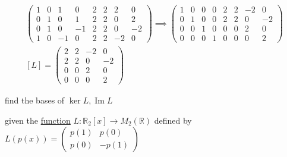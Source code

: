 \documentclass[a4paper,12pt]{article}
\DeclareMathOperator{\img}{Im}
\begin{document}
\begin{definition}
\begin{question}
\begin{subquestion}
\begin{answer}
\begin{gather*}
  \left(
    \begin{array}{cccc|cccc}
      1 & 0 & 1 & 0 & 2 & 2 & 2 & 0\\
      0 & 1 & 0 & 1 & 2 & 2 & 0 & 2\\
      0 & 1 & 0 & -1 & 2 & 2 & 0 & -2\\
      1 & 0 & -1 & 0 & 2 & 2 & -2 & 0
    \end{array}
  \right) \implies
  \left(
    \begin{array}{cccc|cccc}
      1 & 0 & 0 & 0 & 2 & 2 & -2 & 0\\
      0 & 1 & 0 & 0 & 2 & 2 & 0 & -2\\
      0 & 0 & 1 & 0 & 0 & 0 & 2 & 0\\
      0 & 0 & 0 & 1 & 0 & 0 & 0 & 2
    \end{array}
  \right)\\
  [L] = \begin{pmatrix}
          2 & 2 & -2 & 0\\
          2 & 2 & 0 & -2\\
          0 & 0 & 2 & 0\\
          0 & 0 & 0 & 2
        \end{pmatrix}
\end{gather*}
\end{answer}
\end{subquestion}

\begin{subquestion}
find the bases of \(\ker L, \img L\)\\
\end{subquestion}
\end{question}

\begin{question}
given the \href{discrete_maths2.org}{function} \(L: \mathbb{R}_2[x] \to M_2(\mathbb{R})\) defined by \(L(p(x)) = \begin{pmatrix} p(1) & p(0)\\ p(0) & -p(1) \end{pmatrix}\)\\


\end{question}
\end{definition}
\end{document}

